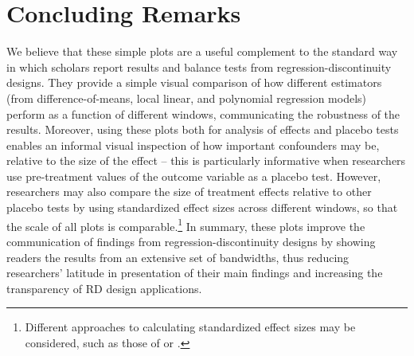 \documentclass[letterpaper,twoside,12pt]{article}\usepackage[]{graphicx}\usepackage[]{color}
\begin{document}
\section*{Concluding Remarks}

We believe that these simple plots are a useful complement to the standard way in which scholars report results and balance tests from regression-discontinuity designs. They provide a simple visual comparison of how different estimators (from difference-of-means, local linear, and polynomial regression models) perform as a function of different windows, communicating the robustness of the results. Moreover, using these plots both for analysis of effects and placebo tests enables an informal visual inspection of how important confounders may be, relative to the size of the effect -- this is particularly informative when researchers use pre-treatment values of the outcome variable as a placebo test. However, researchers may also compare the size of treatment effects relative to other placebo tests by using standardized effect sizes across different windows, so that the scale of all plots is comparable.\footnote{Different approaches to calculating standardized effect sizes may be considered, such as those of \citet{glass1976} or \citet{ellis2010}.} In summary, these plots improve the communication of findings from regression-discontinuity designs by showing readers the results from an extensive set of bandwidths, thus reducing researchers' latitude in presentation of their main findings and increasing the transparency of RD design applications.



\clearpage
	

\end{document}
